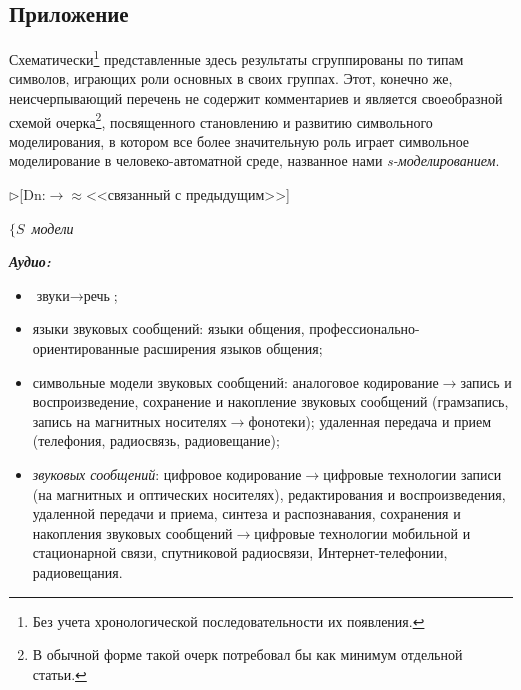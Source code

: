\begin{multicols}{2}
{{\subsection*{Приложение}

Схематически\footnote{Без учета хронологической последовательности их
появления.} представленные здесь результаты сгруппированы по типам символов, 
играющих роли основных в своих группах. Этот, конечно же, неисчерпывающий 
перечень не содержит комментариев и является своеобразной схемой 
очерка\footnote{В обычной форме такой очерк потребовал бы как минимум отдельной 
статьи.}, посвященного становлению и развитию символьного моделирования, в 
котором все более значительную роль играет символьное моделирование в 
че\-ло\-ве\-ко-ав\-то\-мат\-ной среде, названное нами 
\textit{s-мо\-де\-ли\-ро\-ва\-ни\-ем}.

\noindent
$\triangleright$[Dn:\;$\rightarrow \approx$\;<<связанный с предыдущим>>]

\noindent
 $\{S$~\textit{модели}

\medskip
{\bfseries\textit{Аудио:}}
\smallskip

\begin{itemize}
\item $\mbox{звуки}\rightarrow\mbox{речь}$;
\item языки звуковых сообщений: языки общения,
про\-фес\-сио\-наль\-но-ори\-ен\-ти\-ро\-ван\-ные расширения языков общения;
\item символьные модели звуковых сообщений: анало\-го\-вое
кодирование\;$\rightarrow$\;запись и воспроизведение, сохранение и накопление 
звуковых сообщений (грамзапись, запись на магнитных 
носителях\;$\rightarrow$\;фонотеки); удаленная передача и прием 
(те\-ле\-фо\-ния, радиосвязь, радиовещание); 
\item \textit{звуковых сообщений}: цифровое 
ко\-ди\-ро\-ва\-ние\;$\rightarrow$\;циф\-ро\-вые технологии записи (на 
магнитных и оптических носителях), редактирования и воспроизведения, удаленной 
передачи и приема, синтеза и распознавания, сохранения и накопления звуковых 
со\-об\-ще\-ний\;$\rightarrow$\;циф\-ро\-вые технологии мобильной и 
стационарной связи, спутниковой радиосвязи, Интернет-телефонии, радиовещания. 
{%

}
\end{itemize}

}}
\end{multicols}
